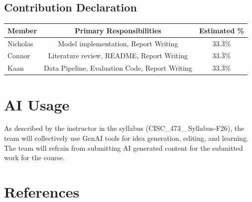 \documentclass[11pt, letterpaper]{article}
\begin{document}
\subsection{Contribution Declaration}

\begin{tabular}{lcc}
\toprule
\textbf{Member} & \textbf{Primary Responsibilities} & \textbf{Estimated \%} \\
\midrule
Nicholas & Model implementation, Report Writing & 33.$\bar{3}$\%  \\
Connor & Literature review, README, Report Writing & 33.$\bar{3}$\%  \\
Kaan & Data Pipeline, Evaluation Code, Report Writing & 33.$\bar{3}$\%  \\
\bottomrule
\end{tabular}

\section{AI Usage}

As described by the instructor in the syllabus (CISC\_473\_ Syllabus-F26), the team will collectively use GenAI tools for idea generation, editing, and learning. The team will refrain from submitting AI generated content for the submitted work for the course.
\section{References}
\end{document}
